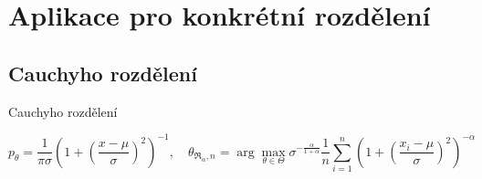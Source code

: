 \documentclass[11pt,a4paper]{beamer}
\newcommand{\amtiT}{\arg \max_{\theta \in \Theta}}
\begin{document}
\section{Aplikace pro konkrétní rozdělení}
\subsection{Cauchyho rozdělení}    %
\begin{frame}{Cauchyho rozdělení}

\parbox[t]{\linewidth}{\footnotesize	\[p_\theta = \frac{1}{\pi\sigma} \left( 1 + \left( \frac{x-\mu}{\sigma} \right)^2 \right)^{-1},\quad  \theta_{\mathfrak{R}_\alpha,n} = \amtiT \sigma^{-\frac{\alpha}{1+\alpha}} \frac{1}{n} \sum_{i=1}^n \left( 1 + \left( \frac{x_i-\mu}{\sigma} \right)^2 \right)^{-\alpha} \nonumber\]}


\end{frame}
\end{document}
